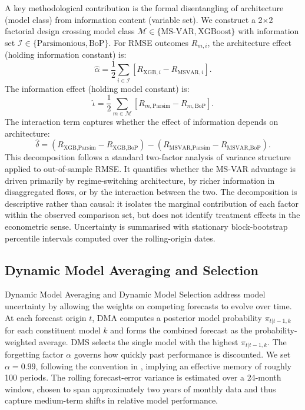 \documentclass[12pt,a4paper]{article}
\begin{document}
A key methodological contribution is the formal disentangling of architecture (model class) from information content (variable set). We construct a 2$\times$2 factorial design crossing model class $\mathcal{M} \in \{\text{MS-VAR}, \text{XGBoost}\}$ with information set $\mathcal{I} \in \{\text{Parsimonious}, \text{BoP}\}$. For RMSE outcomes $R_{m,i}$, the architecture effect (holding information constant) is:
\[
\hat{\alpha} = \frac{1}{2}\sum_{i \in \mathcal{I}} \left[ R_{\text{XGB},i} - R_{\text{MSVAR},i} \right].
\]
The information effect (holding model constant) is:
\[
\hat{\iota} = \frac{1}{2}\sum_{m \in \mathcal{M}} \left[ R_{m,\text{Parsim}} - R_{m,\text{BoP}} \right].
\]
The interaction term captures whether the effect of information depends on architecture:
\[
\hat{\delta} = \left(R_{\text{XGB,Parsim}} - R_{\text{XGB,BoP}}\right) - \left(R_{\text{MSVAR,Parsim}} - R_{\text{MSVAR,BoP}}\right).
\]
This decomposition follows a standard two-factor analysis of variance structure applied to out-of-sample RMSE. It quantifies whether the MS-VAR advantage is driven primarily by regime-switching architecture, by richer information in disaggregated flows, or by the interaction between the two. The decomposition is descriptive rather than causal: it isolates the marginal contribution of each factor within the observed comparison set, but does not identify treatment effects in the econometric sense. Uncertainty is summarised with stationary block-bootstrap percentile intervals computed over the rolling-origin dates.

\subsection{Dynamic Model Averaging and Selection}

Dynamic Model Averaging and Dynamic Model Selection \citep{Raftery2010,KoopKorobilis2012} address model uncertainty by allowing the weights on competing forecasts to evolve over time. At each forecast origin $t$, DMA computes a posterior model probability $\pi_{t|t-1,k}$ for each constituent model $k$ and forms the combined forecast as the probability-weighted average. DMS selects the single model with the highest $\pi_{t|t-1,k}$. The forgetting factor $\alpha$ governs how quickly past performance is discounted. We set $\alpha = 0.99$, following the convention in \cite{KoopKorobilis2012}, implying an effective memory of roughly 100 periods. The rolling forecast-error variance is estimated over a 24-month window, chosen to span approximately two years of monthly data and thus capture medium-term shifts in relative model performance.
\end{document}
